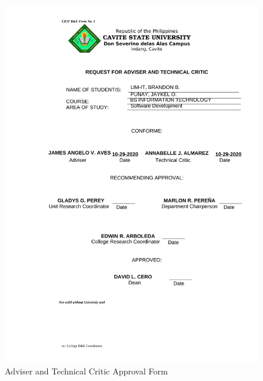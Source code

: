 \clearpage
{}
\null\vfill
\begin{figure}[H]
	 \centering
	 \includegraphics[width=\textwidth]{figures/1_adviser_tc_approval.png}
	 \caption[]{Adviser and Technical Critic Approval Form}
	 \label{fig:adviser_tc_approval}
\end{figure}
\clearpage
\null\vfill
